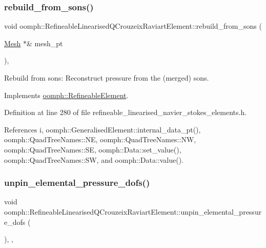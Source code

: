 \subsubsection{\texorpdfstring{rebuild\+\_\+from\+\_\+sons()}{rebuild\_from\_sons()}}
{\footnotesize\ttfamily void oomph\+::\+Refineable\+Linearised\+Q\+Crouzeix\+Raviart\+Element\+::rebuild\+\_\+from\+\_\+sons (\begin{DoxyParamCaption}\item[{\hyperlink{classoomph_1_1Mesh}{Mesh} $\ast$\&}]{mesh\+\_\+pt }\end{DoxyParamCaption})\hspace{0.3cm}{\ttfamily [inline]}, {\ttfamily [virtual]}}



Rebuild from sons\+: Reconstruct pressure from the (merged) sons. 



Implements \hyperlink{classoomph_1_1RefineableElement_a33324be27833fa4b78279d17158215fa}{oomph\+::\+Refineable\+Element}.



Definition at line 280 of file refineable\+\_\+linearised\+\_\+navier\+\_\+stokes\+\_\+elements.\+h.



References i, oomph\+::\+Generalised\+Element\+::internal\+\_\+data\+\_\+pt(), oomph\+::\+Quad\+Tree\+Names\+::\+NE, oomph\+::\+Quad\+Tree\+Names\+::\+NW, oomph\+::\+Quad\+Tree\+Names\+::\+SE, oomph\+::\+Data\+::set\+\_\+value(), oomph\+::\+Quad\+Tree\+Names\+::\+SW, and oomph\+::\+Data\+::value().

\mbox{\label{classoomph_1_1RefineableLinearisedQCrouzeixRaviartElement_a9d591ec2c270582b5541d0d0767035a5}} 
\subsubsection{\texorpdfstring{unpin\+\_\+elemental\+\_\+pressure\+\_\+dofs()}{unpin\_elemental\_pressure\_dofs()}}
{\footnotesize\ttfamily void oomph\+::\+Refineable\+Linearised\+Q\+Crouzeix\+Raviart\+Element\+::unpin\+\_\+elemental\+\_\+pressure\+\_\+dofs (\begin{DoxyParamCaption}{ }\end{DoxyParamCaption})\hspace{0.3cm}{\ttfamily [inline]}, {\ttfamily [private]}, {\ttfamily [virtual]}}



